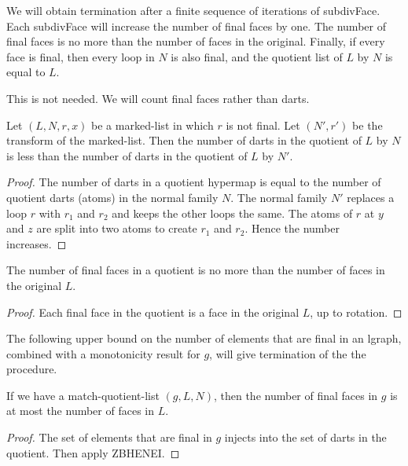 
We will obtain termination after a finite sequence of iterations of subdivFace.  Each subdivFace
will increase the number of final faces by one.  The number of final faces
 is no more than the number of faces in the original.  Finally,
if every face  is final, then every loop in $N$ is also final, and the quotient list of $L$ by $N$ is equal to $L$.

This is not needed. We will count final faces rather than darts.

\begin{lemma}  Let $(L,N,r,x)$ be a marked-list in which $r$ is not final.
Let $(N',r')$ be the transform of the marked-list.  Then the number of darts in the
quotient of $L$ by $N$ is less than the number of darts in the quotient of $L$ by $N'$.
\end{lemma}

\begin{proof}  The number of darts in a quotient hypermap is equal
to the number of quotient darts (atoms) in the normal family $N$.
The normal family $N'$ replaces a loop $r$ with $r_1$ and $r_2$
and keeps the other loops the same.  The atoms of $r$ at
$y$ and $z$ are split into two atoms to create $r_1$ and $r_2$.
Hence the number increases.
\end{proof}


\begin{lemma}  The number of final faces in a quotient is no more than
the number of faces in the original $L$.
\end{lemma}

\begin{proof} 
Each final face in the quotient is a face in the original $L$, up to rotation.
\end{proof}

The following upper bound on the number of elements that are final in 
an lgraph, combined with a monotonicity result for $g$, will give termination
of the the procedure.

\begin{lemma} If we have a match-quotient-list $(g,L,N)$,
then the number of final faces  in $g$ is at most the number of faces in $L$.
\end{lemma}

\begin{proof}  The set of elements that are final in $g$ injects into the
set of darts in the quotient.  Then apply ZBHENEI.
\end{proof}

